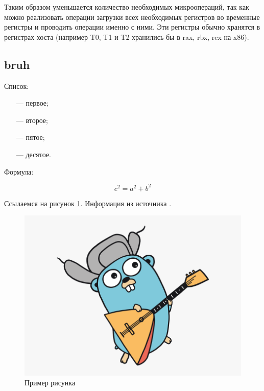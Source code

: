 Таким образом уменьшается количество необходимых микроопераций, так как можно реализовать операции загрузки всех необходимых регистров во временные регистры и проводить операции именно с ними. Эти регистры обычно хранятся в регистрах хоста (например T0, T1 и T2 хранились бы в rax, rbx, rcx на x86).

\subsection{bruh}

Список:

\begin{itemize}[leftmargin=1.6\parindent]
	\item[---] первое;
	\item[---] второе;
	\item[---] пятое;
	\item[---] десятое.
\end{itemize}

Формула:

\begin{equation}
c^2 = a^2 + b^2
\end{equation}

Ссылаемся на рисунок \ref{fig:a1}. Информация из источника \cite{golang}.

\begin{figure}[hbtp]
	\centering
	\includegraphics[width=\textwidth]{img/golang.png}
	\caption{Пример рисунка}
	\label{fig:a1}
\end{figure}


\pagebreak
